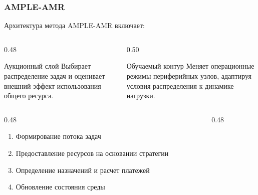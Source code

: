 \begin{frame}[shrink=5]
	\frametitle{AMPLE-AMR}
	\small
	Архитектура метода AMPLE-AMR включает:
	\begin{columns}[T,onlytextwidth]
		\begin{column}{0.48\textwidth}
			\begin{block}{Аукционный слой}
				Выбирает распределение задач и оценивает внешний эффект использования общего ресурса.
			\end{block}
		\end{column}
		\begin{column}{0.50\textwidth}
			\begin{block}{Обучаемый контур}
				Меняет операционные режимы периферийных узлов, адаптируя условия распределения к динамике нагрузки.
			\end{block}
		\end{column}
	\end{columns}
	\medskip
	\medskip
	\begin{columns}[T,onlytextwidth]
		\begin{column}{0.48\textwidth}
			\medskip
			\medskip
			\medskip
			\begin{enumerate}
				\item Формирование потока задач
				\item Предоставление ресурсов на основании стратегии
				\item Определение назначений и расчет платежей
				\item Обновление состояния среды
			\end{enumerate}
		\end{column}
		\begin{column}{0.48\textwidth}
		\end{column}
	\end{columns}
\end{frame}

